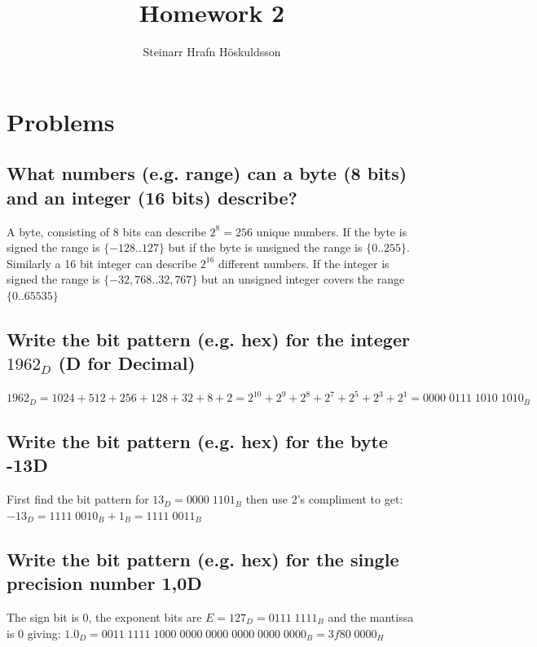 \documentclass{article}
\title{Homework 2 \\ \big{Mechatronics II}}
\author{Steinarr Hrafn Höskuldsson}
\newcommand{\mycomment}[1]{}
\begin{document}
\mycomment{

\begin{figure}[h]
    \centering
    \texttt{[image: LAB3/Basic1.png]}
    \caption{"Switch test" Breadboard set up}
    \label{fig:Switch_test}
\end{figure}



} %

\pagestyle{firststyle}
{\let\newpage\relax\maketitle}

\section*{Problems}

\subsection*{ What numbers (e.g. range) can a byte (8 bits) and an integer (16 bits) describe?}
A byte, consisting of 8 bits can describe $2^8 = 256$ unique numbers. If the byte is signed the range is $\{-128 .. 127\}$ but if the byte is unsigned the range is $\{0 .. 255\}$. Similarly a 16 bit integer can describe $2^{16}$ different numbers. If the integer is signed the range is $\{-32,768 .. 32,767\}$ but an unsigned integer covers the range $\{0 .. 65535\}$
\subsection*{ Write the bit pattern (e.g. hex) for the integer $1962_D$ (D for Decimal)}
$1962_D = 1024 + 512 + 256 + 128 + 32 + 8 + 2 = 2^{10} + 2^9 + 2^8 + 2^7 + 2^5 + 2^3 + 2^1 = 0000\;0111\;1010\;1010_B$

\subsection*{ Write the bit pattern (e.g. hex) for the byte  -13D}
First find the bit pattern for $13_D = 0000\;1101_B$ then use 2's compliment to get:\\
$-13_D = 1111\;0010_B + 1_B = 1111\;0011_B$
\subsection*{ Write the bit pattern (e.g. hex) for the single precision number 1,0D}
The sign bit is 0, the exponent bits are $E=127_D = 0111\; 1111_B$ and the mantissa is 0 giving: $1.0_D = 0011\;1111\; 1000\; 0000\; 0000\; 0000\; 0000\; 0000_B = 3f80\;0000_H$
\end{document}
